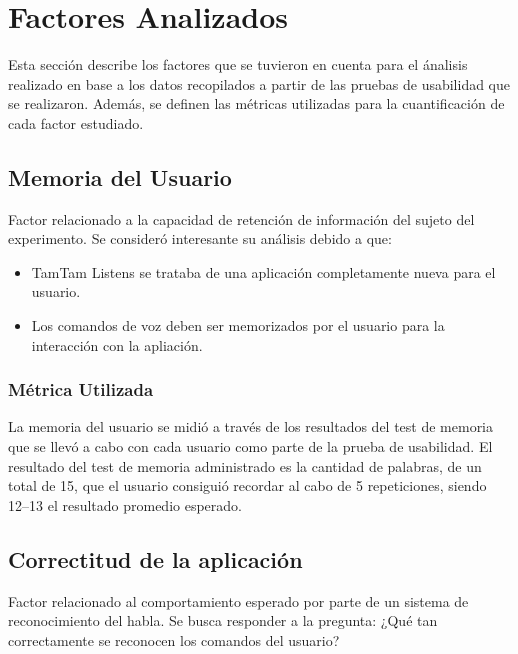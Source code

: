 \section{Factores Analizados}
\label{sec:factores}

Esta sección describe los factores que se tuvieron en cuenta para el ánalisis realizado
en base a los datos recopilados a partir de las pruebas de usabilidad que se realizaron.
Además, se definen las métricas utilizadas para la cuantificación de cada factor estudiado.

\subsection{Memoria del Usuario}
Factor relacionado a la capacidad de retención de información del sujeto del experimento.
Se consideró interesante su análisis debido a que:
\begin{itemize}
	\item TamTam Listens se trataba de una aplicación completamente nueva para el usuario.
	\item Los comandos de voz deben ser memorizados por el usuario para la interacción con
	la apliación.
\end{itemize}
\subsubsection{Métrica Utilizada}
La memoria del usuario se midió a través de los resultados del test de memoria que se llevó
a cabo con cada usuario como parte de la prueba de usabilidad.
El resultado del test de memoria administrado es la cantidad de palabras, de un total de 15,
que el usuario consiguió recordar al cabo de 5 repeticiones, siendo 12--13 el resultado promedio
esperado.

\subsection{Correctitud de la aplicación}
Factor relacionado al comportamiento esperado por parte de un sistema de reconocimiento del
habla. Se busca responder a la pregunta: ¿Qué tan correctamente se reconocen los comandos 
del usuario?
